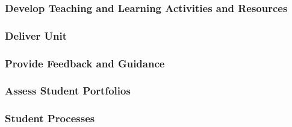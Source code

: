 
\subsubsection{Develop Teaching and Learning Activities and Resources} %
\label{ssub:develop_teaching_and_learning_activities_and_resources}


\subsubsection{Deliver Unit} %
\label{ssub:deliver_unit}


\subsubsection{Provide Feedback and Guidance} %
\label{ssub:provide_feedback_and_guidance}


\subsubsection{Assess Student Portfolios} %
\label{ssub:assess_student_portfolios}


\subsubsection{Student Processes} %
\label{ssub:student_processes}


